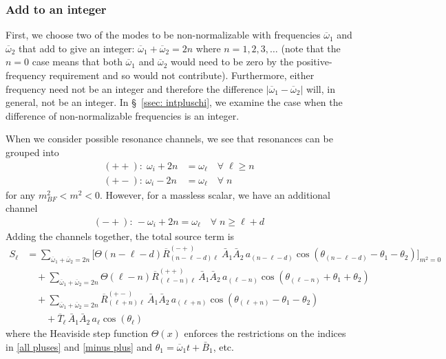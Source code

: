 \documentclass[letterpaper,11pt]{article}
\newcommand{\oone}{\overline{\omega}_1}
\newcommand{\otwo}{\overline{\omega}_2}
\begin{document}
\subsubsection{Add to an integer}
\label{ssec: add to integer}

First, we choose two of the modes to be non-normalizable with frequencies $\oone$ and $\otwo$ that add to give an integer: $\oone+ \otwo = 2n$ where $n = 1, 2, 3, \ldots$ (note that the $n = 0$ case means that both $\oone$ and $\otwo$ would need to be zero by the positive-frequency requirement and so would not contribute). Furthermore, either frequency need not be an integer and therefore the difference $|\oone - \otwo|$ will, in general, not be an integer. In \S\!~\ref{ssec: intpluschi}, we examine the case when the difference of non-normalizable frequencies is an integer.

When we consider possible resonance channels, we see that resonances can be grouped into
\begin{align}
\label{all pluses}
(++): \; \omega_i + 2n &= \omega_\ell \quad \forall \; \ell \geq n \\
(+-): \, \omega_i - 2n &=\omega_\ell \quad \forall \; n
\end{align}
for any $m^2_{BF} < m^2 < 0$. However, for a massless scalar, we have an additional channel
\begin{align}
\label{minus plus}
(-+): \, -\omega_i + 2n = \omega_\ell \quad \forall \; n \geq \ell + d
\end{align}
Adding the channels together, the total source term is
\begin{align}
\label{add to integer}
S_\ell &=  \!\!\!\! \sum_{\oone + \otwo = 2n}\bigg[ \Theta\left( n - \ell - d \right) \overline{R}^{(-+)}_{(n - \ell - d) \ell} \ \bar A_1 \bar A_2 \, a_{(n - \ell - d)} \cos \left( \theta_{(n - \ell - d)} - \theta_1 - \theta_2 \right) \bigg]_{m^2 = 0}  \nonumber \\ 
%
&  \quad + \!\!\!\! \sum_{\oone + \otwo = 2n} \!\!\!\! \Theta \left( \ell - n \right)  \overline{R}^{(++)}_{(\ell - n)\ell} \, \bar A_1 \bar A_2 \, a_{(\ell - n)} \cos \left( \theta_{(\ell - n)} + \theta_1 + \theta_2 \right) \nonumber \\
%
& \quad  + \!\!\!\! \sum_{\oone + \otwo = 2n} \!\!\!\! \overline{R}^{(+-)}_{(\ell + n) \ell} \, \bar A_1 \bar A_2 \, a_{(\ell + n)} \cos\left( \theta_{(\ell + n)} - \theta_1 - \theta_2 \right) \nonumber \\
%
& \qquad + \overline{T}_{\ell} \, \bar A_1 \bar A_2 \, a_\ell \cos \left( \theta_\ell \right)
\end{align}
where the Heaviside step function $\Theta(x)$ enforces the restrictions on the indices in \eqref{all pluses} and \eqref{minus plus} and $\theta_1 = \oone t + \bar B_1$, etc. 
\end{document}
